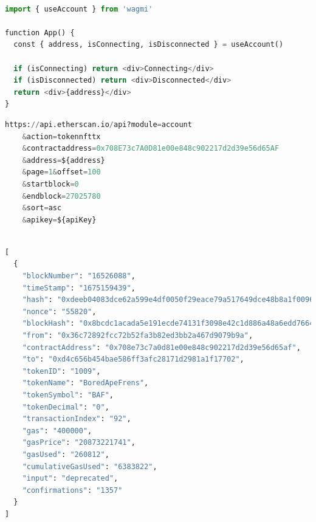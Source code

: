 \begin{center}
\begin{lstlisting}[label=lst:wagmi ,language=python, caption=An example of getting a wallet's public address using \textit{wagmi React Hooks for Ethereum} \cite{wagmi}. This can be used once the wallet has been connected successfully., captionpos=b]

import { useAccount } from 'wagmi'
 
function App() {
  const { address, isConnecting, isDisconnected } = useAccount()
 
  if (isConnecting) return <div>Connecting</div>
  if (isDisconnected) return <div>Disconnected</div>
  return <div>{address}</div>
}

\end{lstlisting}
\end{center}


\begin{center}
\begin{lstlisting}[label=lst:wagmi ,language=python, caption=asdf., captionpos=b]
https://api.etherscan.io/api?module=account
    &action=tokennfttx
    &contractaddress=0x708E73c7A0D81e00e848c902217d2d39e56d65AF
    &address=${address}
    &page=1&offset=100
    &startblock=0
    &endblock=27025780
    &sort=asc
	&apikey=${apiKey}
\end{lstlisting}
\end{center}


\begin{center}
\begin{lstlisting}[label=lst:wagmi ,language=python, caption=asdf., captionpos=b]

[
  {
    "blockNumber": "16526088",
    "timeStamp": "1675159439",
    "hash": "0xdeeb04083dce62a599e4df0050f29eace79a517649dce48b8a1f00961f39742c",
    "nonce": "55820",
    "blockHash": "0x8bcdc1acada5e191ecde74131f3098e42c1d886a48a6edd766425c725d976455",
    "from": "0x36c72892fcc72b52fa3b82ed3bb2a467d9079b9a",
    "contractAddress": "0x708e73c7a0d81e00e848c902217d2d39e56d65af",
    "to": "0xd4c656b454bae586ff3afc28171d2981a1f17702",
    "tokenID": "1009",
    "tokenName": "BoredApeFrens",
    "tokenSymbol": "BAF",
    "tokenDecimal": "0",
    "transactionIndex": "92",
    "gas": "400000",
    "gasPrice": "20873221741",
    "gasUsed": "260812",
    "cumulativeGasUsed": "6383822",
    "input": "deprecated",
    "confirmations": "1357"
  }
]

\end{lstlisting}
\end{center}